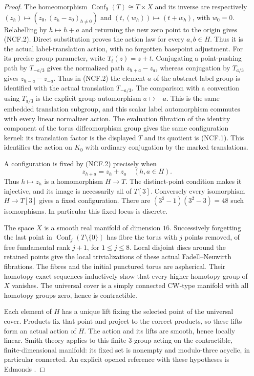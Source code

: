 \begin{proof}
The homeomorphism
$\operatorname{Conf}_9(T)\cong T\times X$
and its inverse are respectively
$(z_h)\mapsto(z_0,(z_h-z_0)_{h\ne0})$ and
$(t,(w_h))\mapsto(t+w_h)$, with $w_0=0$.
Relabelling by $h\mapsto h+a$ and returning the
new zero point to the origin gives (NCF.2).
Direct substitution proves the action law for every
$a,b\in H$. Thus it is the actual label-translation
action, with no forgotten basepoint adjustment.
For its precise group parameter, write $T_t(z)=z+t$.
Conjugating a point-pushing path by $T_{-a/3}$ gives
the normalized path $z_{h+a}-z_a$, whereas conjugation
by $T_{a/3}$ gives $z_{h-a}-z_{-a}$.
Thus in (NCF.2) the element $a$ of the abstract label
group is identified with the actual translation
$T_{-a/3}$.  The comparison with a convention using
$T_{a/3}$ is the explicit group automorphism
$a\mapsto-a$.  This is the same embedded translation
subgroup, and this scalar label automorphism commutes
with every linear normalizer action.
The evaluation fibration of the identity component
of the torus diffeomorphism group gives the same
configuration kernel: its translation factor is
the displayed $T$ and its quotient is (NCF.1).
This identifies the action on $K_0$ with ordinary
conjugation by the marked translations.

A configuration is fixed by (NCF.2) precisely when
\[
                 z_{h+a}=z_h+z_a\quad(h,a\in H).
                                                               \tag{NCF.4}
\]
Thus $h\mapsto z_h$ is a homomorphism $H\to T$.
The distinct-point condition makes it injective,
and its image is necessarily all of $T[3]$.
Conversely every isomorphism $H\to T[3]$ gives a
fixed configuration. There are
$(3^2-1)(3^2-3)=48$ such isomorphisms.
In particular this fixed locus is discrete.

The space $X$ is a smooth real manifold of dimension
$16$. Successively forgetting the last point in
$\operatorname{Conf}_j(T\setminus\{0\})$ has fibre
the torus with $j$ points removed, of free
fundamental rank $j+1$, for $1\leq j\leq8$.
Local disjoint discs around the retained points
give the local trivializations of these actual
Fadell--Neuwirth fibrations. The fibres and the
initial punctured torus are aspherical. Their
homotopy exact sequences inductively show that
every higher homotopy group of $X$ vanishes.
The universal cover is a simply connected CW-type
manifold with all homotopy groups zero, hence is
contractible.

Each element of $H$ has a unique lift fixing the
selected point of the universal cover. Products
fix that point and project to the correct products,
so these lifts form an actual action of $H$.
The action and its lifts are smooth, hence locally
linear. Smith theory applies to this finite
$3$-group acting on the contractible, finite-dimensional
manifold: its fixed set is nonempty and
modulo-three acyclic, in particular connected.
An explicit opened reference with these hypotheses
is Edmonds \cite[printed pp.~273--274, Proposition~3.2.1,
Theorem~3.3.1 and Proposition~3.3.2]{ET_Edmonds2012}.


\end{proof}
